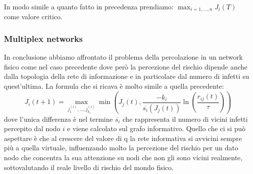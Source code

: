 In modo simile a quanto fatto in precedenza prendiamo: $\max_{i= 1,\dots,n}J_{i}(T)$ come valore critico.

\subsubsection{Multiplex networks}\label{subsubsec:multiplex-networks}
In conclusione abbiamo affrontato il problema della percolazione in un network fisico come nel caso precedente dove però la
percezione del rischio dipende anche dalla topologia della rete di informazione e in particolare dal numero di
infetti su quest'ultima.
La formula che si ricava è molto simile a quella precedente:
\begin{equation}
    J_{i}(t+1)=\max_{j^{(i)}_{1},\dots,j^{(i)}_{k_{i}}}\min(J_{j}(t),\frac{-k_{ i}}{\overline{s_{i}}(J_{j}(t))}\ln(\frac{r_{ij}(t)}{\tau}))\label{eq:multiplex}
\end{equation}
dove l'unica differenza è nel termine $\overline{s_{i}}$ che rappresenta il numero di vicini infetti percepito
dal nodo $i$ e viene calcolato sul grafo informativo.
Quello che ci si può aspettare è che al crescere del valore di q la rete informativa si avvicini sempre più a quella
virtuale, influenzando molto la percezione del rischio per un dato nodo che concentra la sua attenzione su nodi che non
gli sono vicini realmente, sottovalutando il reale livello di rischio del mondo fisico.
